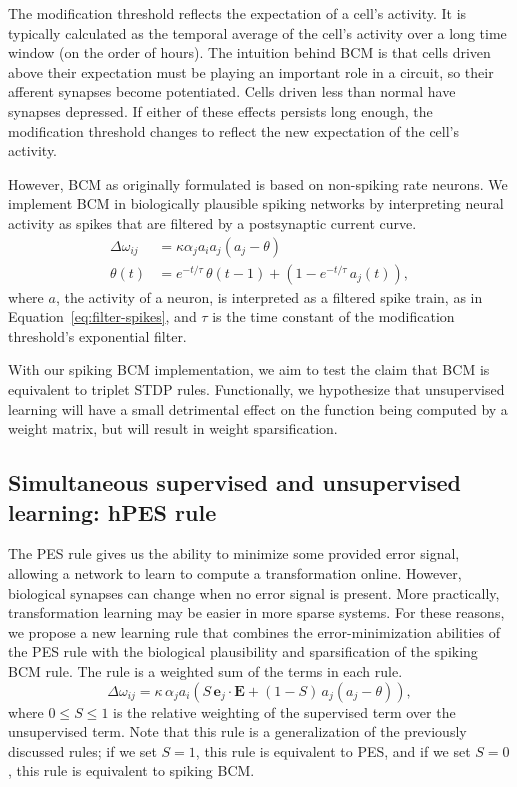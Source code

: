 \documentclass[10pt,letterpaper]{article}
\begin{document}
The modification threshold reflects the expectation
of a cell's activity.
It is typically calculated as
the temporal average of the cell's activity
over a long time window (on the order of hours).
The intuition behind BCM is that cells
driven above their expectation
must be playing an important role in a circuit,
so their afferent synapses become potentiated.
Cells driven less than normal have synapses depressed.
If either of these effects persists long enough,
the modification threshold changes
to reflect the new expectation
of the cell's activity.

However, BCM as originally formulated
is based on non-spiking rate neurons.
We implement BCM in biologically plausible spiking networks
by interpreting neural activity as
spikes that are filtered by
a postsynaptic current curve.
\begin{align} \label{eq:bcm}
  \Delta \omega_{ij} &= \kappa \alpha_j a_i a_j (a_j - \theta) \nonumber \\
  \theta(t) &= e^{-t / \tau} \, \theta(t-1) +
               (1 - e^{-t / \tau} \, a_j(t)),
\end{align}
where $a$, the activity of a neuron,
is interpreted as a filtered spike train,
as in Equation~\eqref{eq:filter-spikes},
and $\tau$ is
the time constant of
the modification threshold's exponential filter.

With our spiking BCM implementation,
we aim to test the claim that BCM is equivalent
to triplet STDP rules.
Functionally, we hypothesize that
unsupervised learning
will have a small detrimental effect
on the function being computed by a weight matrix,
but will result in weight sparsification.

\subsection{Simultaneous supervised and unsupervised learning: hPES rule}

The PES rule gives us the ability to
minimize some provided error signal,
allowing a network to
learn to compute a transformation online.
However, biological synapses can change
when no error signal is present.
More practically,
transformation learning may be easier
in more sparse systems.
For these reasons, we propose a new learning rule
that combines the error-minimization abilities of the PES rule
with the biological plausibility and sparsification
of the spiking BCM rule.
The rule is a weighted sum of the
terms in each rule.
\begin{equation} \label{eq:hpes}
  \Delta \omega_{ij} = \kappa \, \alpha_j a_i \left(
    S \, \mathbf{e}_j \cdot \mathbf{E} + (1 - S) \, a_j(a_j - \theta) \right),
\end{equation}
where $0 \le S \le 1$ is the relative weighting of
the supervised term over the unsupervised term.
Note that this rule is a generalization
of the previously discussed rules;
if we set $S = 1$,
this rule is equivalent to PES, and
if we set $S = 0$,
this rule is equivalent to spiking BCM.
\end{document}
